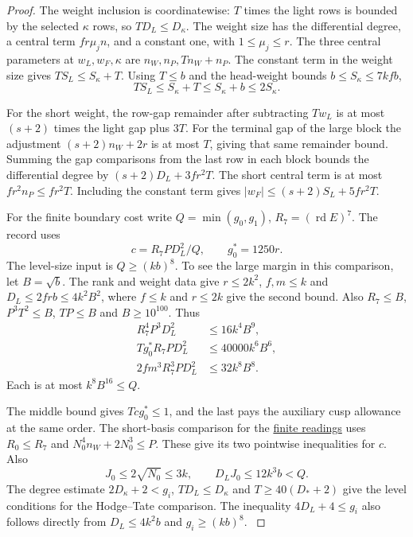 \begin{proof}
The weight inclusion is coordinatewise:
\(T\) times the light rows is bounded by the selected
\(\kappa\) rows, so \(TD_L\le D_\kappa\).
The weight size has the differential degree, a central term
\(fr\mu_j n\), and a constant one, with \(1\le\mu_j\le r\).
The three central parameters at \(w_L,w_F,\kappa\) are
\(n_W,n_P,Tn_W+n_P\). The constant term in the weight size gives \(TS_L\le S_\kappa+T\).
Using \(T\le b\) and the head-weight bounds \(b\le S_\kappa\le7kfb\),
\[
 TS_L\le S_\kappa+T\le S_\kappa+b\le2S_\kappa .
\]

For the short weight, the row-gap
remainder after subtracting \(T w_L\) is at most
\((s+2)\) times the light gap plus \(3T\). For the
terminal gap of the large block the adjustment
\((s+2)n_W+2r\) is at most \(T\), giving that same remainder
bound. Summing the gap comparisons from the last row in
each block bounds the differential degree by
\((s+2)D_L+3fr^2T\). The short central term is at most
\(fr^2 n_P\le fr^2T\). Including the constant term gives
\(|w_F|\le(s+2)S_L+5fr^2T\).
\label{cor:slice-scales-2}

For the finite boundary cost write \(Q=\min(g_0,g_1)\),
\(R_7=(\operatorname{rd}E)^7\). The record uses
\[
             c=R_7P D_L^2/Q,
             \qquad g_0^*=1250r .
\]
The level-size input is \(Q\ge(kb)^8\).
To see the large margin in this comparison, let
\(B=\sqrt b\). The rank and weight data give
\(r\le2k^2\), \(f,m\le k\) and \(D_L\le2frb\le4k^2B^2\),
where \(f\le k\) and \(r\le2k\) give the second bound.
Also \(R_7\le B\), \(P^3T^2\le B\), \(TP\le B\)
and \(B\ge10^{100}\). Thus
\[
\begin{split}
 R_7^4P^3D_L^2 &\le16 k^4 B^9,\\
 Tg_0^*R_7PD_L^2 &\le40000 k^6 B^6,\\
 2fm^3 R_7^3 P D_L^2 &\le32 k^8 B^8 .
\end{split}
\]
Each is at most \(k^8 B^{16}\le Q\).

The middle bound
gives \(Tc g_0^*\le1\), and the last pays the auxiliary
cusp allowance at the same order. The short-basis
comparison for the \hyperref[par:slice-finite-depth]{finite readings} uses
\(R_0\le R_7\) and \(N_0^4n_W+2N_0^3\le P\).
These give its two pointwise inequalities for \(c\).
Also \[
 J_0\le2\sqrt{N_0}\le3k,\qquad D_LJ_0\le12k^3 b<Q.
\] The degree estimate
\(2D_\kappa+2<g_i\), \(TD_L\le D_\kappa\) and
\(T\ge40(D_*+2)\) give the level conditions for the
Hodge--Tate comparison. The inequality \(4D_L+4\le g_i\)
also follows directly from \(D_L\le4k^2b\) and
\(g_i\ge(kb)^8\).
\label{cor:slice-scales-3}


\end{proof}

